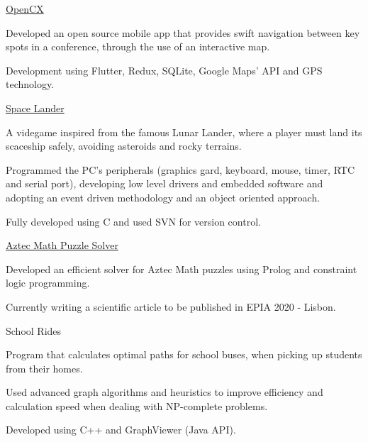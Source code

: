 
\begin{cventries}

  \cventry
    {} %
    {\href{https://github.com/softeng-feup/open-cx}{OpenCX}} %
    {} %
    {} %
    {
      \begin{cvitems} %
      	\item {Developed an open source mobile app that provides swift navigation between key spots in a conference, through the use of an interactive map.}
		    \item {Development using Flutter, Redux, SQLite, Google Maps' API and GPS technology.}
      \end{cvitems}
    }

    \cventry
    {} %
    {\href{https://github.com/MiguelDelPinto/LCOM_TPs}{Space Lander}} %
    {} %
    {} %
    {
      \begin{cvitems} %
      	\item {A videgame inspired from the famous Lunar Lander, where a player must land its scaceship safely, avoiding asteroids and rocky terrains.}
      	\item {Programmed the PC's peripherals (graphics gard, keyboard, mouse, timer, RTC and serial port), developing low level drivers and embedded software and adopting an event driven methodology and an object oriented approach.}
		    \item {Fully developed using C and used SVN for version control.}
      \end{cvitems}
    } 

    \cventry
    {} %
    {\href{https://github.com/MiguelDelPinto/PLOG_Proj/tree/master/AztecMath}{Aztec Math Puzzle Solver}} %
    {} %
    {} %
    {
      \begin{cvitems} %
        \item {Developed an efficient solver for Aztec Math puzzles using Prolog and constraint logic programming.}
		    \item {Currently writing a scientific article to be published in EPIA 2020 - Lisbon.}
      \end{cvitems}
    }


  \cventry
    {} %
    {School Rides} %
    {} %
    {} %
    {
      \begin{cvitems} %
      	\item {Program that calculates optimal paths for school buses, when picking up students from their homes.}
		    \item {Used advanced graph algorithms and heuristics to improve efficiency and calculation speed when dealing with NP-complete problems.}
		    \item {Developed using C++ and GraphViewer (Java API).}
      \end{cvitems}
    }

   
\end{cventries}